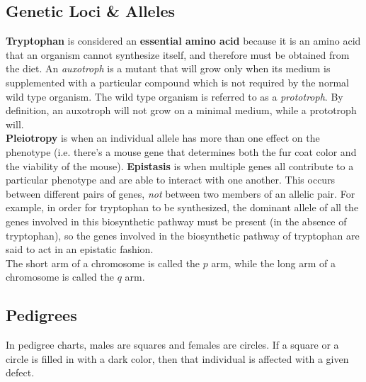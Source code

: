 \documentclass{article}
\theoremstyle{plain}%
\theoremstyle{definition}
\theoremstyle{remark}
\begin{document}
\subsection{Genetic Loci \& Alleles}
\textbf{Tryptophan} is considered an \textbf{essential amino acid} because it is an amino acid that an organism cannot synthesize itself, and therefore must be obtained from the diet. An \textit{auxotroph} is a mutant that will grow only when its medium is supplemented with a particular compound which is not required by the normal wild type organism. The wild type organism is referred to as a \textit{prototroph}. By definition, an auxotroph will not grow on a minimal medium, while a prototroph will. \\
\indent \textbf{Pleiotropy} is when an individual allele has more than one effect on the phenotype (i.e. there's a mouse gene that determines both the fur coat color and the viability of the mouse). \textbf{Epistasis} is when multiple genes all contribute to a particular phenotype and are able to interact with one another. This occurs between different pairs of genes, \textit{not} between two members of an allelic pair. For example, in order for tryptophan to be synthesized, the dominant allele of all the genes involved in this biosynthetic pathway must be present (in the absence of tryptophan), so the genes involved in the biosynthetic pathway of tryptophan are said to act in an epistatic fashion.\\
\indent The short arm of a chromosome is called the $p$ arm, while the long arm of a chromosome is called the $q$ arm. 

\subsection{Pedigrees}
In pedigree charts, males are squares and females are circles. If a square or a circle is filled in with a dark color, then that individual is affected with a given defect. 
\end{document}
